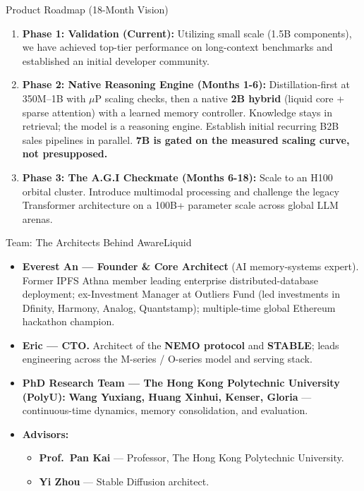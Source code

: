 \documentclass[aspectratio=169, 10pt]{beamer}
\begin{document}
\begin{frame}{Product Roadmap (18-Month Vision)}
\begin{enumerate}
    \item \textbf{Phase 1: Validation (Current):} Utilizing small scale (1.5B components), we have achieved top-tier performance on long-context benchmarks and established an initial developer community.
    \vspace{0.4em}
    \item \textbf{Phase 2: Native Reasoning Engine (Months 1-6):} Distillation-first at 350M--1B with $\mu$P scaling checks, then a native \textbf{2B hybrid} (liquid core + sparse attention) with a learned memory controller. Knowledge stays in retrieval; the model is a reasoning engine. Establish initial recurring B2B sales pipelines in parallel. \textbf{7B is gated on the measured scaling curve, not presupposed.}
    \vspace{0.4em}
    \item \textbf{Phase 3: The A.G.I Checkmate (Months 6-18):} Scale to an H100 orbital cluster. Introduce multimodal processing and challenge the legacy Transformer architecture on a 100B+ parameter scale across global LLM arenas.
\end{enumerate}
\end{frame}

\begin{frame}{Team: The Architects Behind AwareLiquid}
\small
\begin{itemize}\itemsep=0.4em
    \item \textbf{Everest An --- Founder \& Core Architect} (AI memory-systems expert). Former IPFS Athna member leading enterprise distributed-database deployment; ex-Investment Manager at Outliers Fund (led investments in Dfinity, Harmony, Analog, Quantstamp); multiple-time global Ethereum hackathon champion.
    \item \textbf{Eric --- CTO.} Architect of the \textbf{NEMO protocol} and \textbf{STABLE}; leads engineering across the M-series / O-series model and serving stack.
    \item \textbf{PhD Research Team --- The Hong Kong Polytechnic University (PolyU):} \textbf{Wang Yuxiang, Huang Xinhui, Kenser, Gloria} --- continuous-time dynamics, memory consolidation, and evaluation.
    \vspace{0.3em}
    \item \textbf{Advisors:}
    \begin{itemize}
        \item \textbf{Prof.\ Pan Kai} --- Professor, The Hong Kong Polytechnic University.
        \item \textbf{Yi Zhou} --- Stable Diffusion architect.
    \end{itemize}
\end{itemize}
\end{frame}
\end{document}
